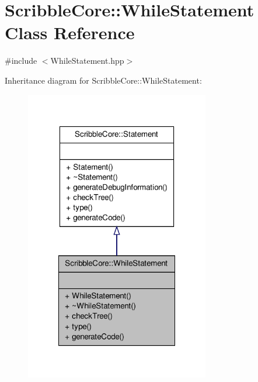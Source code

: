 \hypertarget{class_scribble_core_1_1_while_statement}{\section{Scribble\-Core\-:\-:While\-Statement Class Reference}
\label{class_scribble_core_1_1_while_statement}
}


{\ttfamily \#include $<$While\-Statement.\-hpp$>$}



Inheritance diagram for Scribble\-Core\-:\-:While\-Statement\-:
\nopagebreak
\begin{figure}[H]
\begin{center}
\leavevmode
\includegraphics[width=228pt]{class_scribble_core_1_1_while_statement__inherit__graph}
\end{center}
\end{figure}


